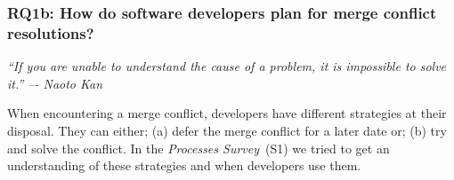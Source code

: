 \subsubsection{\textbf{RQ1b:} How do software developers \textbf{plan} for merge conflict resolutions?}\label{RQ1b}
\vspace*{-0.5\baselineskip}
\begin{quoting}
\textit{``If you are unable to understand the cause of a problem, it is impossible to solve it.'' –- Naoto Kan}
\end{quoting}
\vspace*{+0.3\baselineskip}

When encountering a merge conflict, developers have different strategies at their disposal.
They can either; (a) defer the merge conflict for a later date or; (b) try and solve the conflict.
In the \textit{Processes Survey}~(S1) we tried to get an understanding of these strategies and when developers use them.

